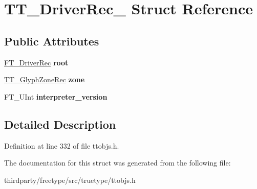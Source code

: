 \hypertarget{struct_t_t___driver_rec__}{}\section{T\+T\+\_\+\+Driver\+Rec\+\_\+ Struct Reference}
\label{struct_t_t___driver_rec__}
\subsection*{Public Attributes}
\begin{DoxyCompactItemize}
\item 
\mbox{\label{struct_t_t___driver_rec___a3a70567ac5409d7ecd3604cdeccf4631}} 
\hyperlink{struct_f_t___driver_rec__}{F\+T\+\_\+\+Driver\+Rec} {\bfseries root}
\item 
\mbox{\label{struct_t_t___driver_rec___a331bcdf6b1b3b46569d5f77f08330ce1}} 
\hyperlink{struct_t_t___glyph_zone_rec__}{T\+T\+\_\+\+Glyph\+Zone\+Rec} {\bfseries zone}
\item 
\mbox{\label{struct_t_t___driver_rec___a72907584e3c65347810e9422ffe02d63}} 
F\+T\+\_\+\+U\+Int {\bfseries interpreter\+\_\+version}
\end{DoxyCompactItemize}


\subsection{Detailed Description}


Definition at line 332 of file ttobjs.\+h.



The documentation for this struct was generated from the following file\+:\begin{DoxyCompactItemize}
\item 
thirdparty/freetype/src/truetype/ttobjs.\+h\end{DoxyCompactItemize}
